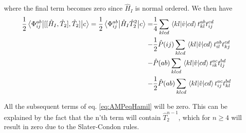 \documentclass[a4paper,12pt]{article}
\newcommand{\hatTt}{\hat{T}_2}
\newcommand{\brak}[2]{\mel{#1}{\hat{v}}{#2}}
\begin{document}
where the final term becomes zero since $\hat{H}_I$ is normal ordered. We then have
\begin{align*}
    \frac{1}{2}\mel{\Phi_{ij}^{ab}}{[[\hat{H}_I,\hatTt],\hatTt]}{c} = \frac{1}{2}\mel{\Phi_{ij}^{ab}}{\hat{H}_I\hatTt^2}{c} =& \frac{1}{4} \sum_{klcd}\brak{kl}{cd}t_{kl}^{ab}t_{ij}^{cd}\\
    -& \frac{1}{2}\hat{P}(ij) \sum_{klcd} \brak{kl}{cd}t^{ab}_{il}t^{cd}_{kj}\\
    -& \hat{P}(ab)\sum_{klcd}\brak{kl}{cd}t_{ik}^{ac}t_{lj}^{bd}\\
    -&\frac{1}{2}\hat{P}(ab)\sum_{klcd}\brak{kl}{cd}t_{ij}^{ac}t_{kl}^{bd}
\end{align*}


All the subsequent terms of eq. \ref{eq:AMPeqHamil} will be zero. This can be explained by the fact that the n'th term will contain $\hatTt^{n - 1}$, which for $n\geq4$ will result in zero due to the Slater-Condon rules.
\end{document}
